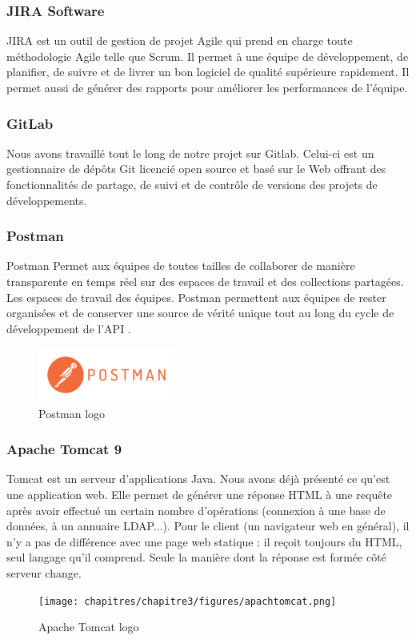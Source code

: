 \subsubsection*{JIRA Software}
JIRA est un outil de gestion de projet Agile qui prend en charge toute m\'ethodologie Agile telle que Scrum. Il permet \`a une \'equipe de d\'eveloppement, de planifier, de suivre et de livrer un bon logiciel de qualit\'e sup\'erieure rapidement. Il permet aussi de g\'en\'erer des rapports pour am\'eliorer les performances de l'\'equipe.
\subsubsection*{GitLab}
Nous avons travaill\'e tout le long de notre projet sur Gitlab. Celui-ci est un gestionnaire de d\'ep\^ots Git licenci\'e open source et bas\'e sur le Web offrant des fonctionnalit\'es de partage, de suivi et de contr\^ole de versions des projets de d\'eveloppements.

\subsubsection*{Postman}
Postman Permet aux \'equipes de toutes tailles de collaborer de mani\`ere transparente en temps r\'eel sur des espaces de travail et des collections partag\'ees. Les espaces de travail des \'equipes. Postman permettent aux \'equipes de rester organis\'ees et de conserver une source de v\'erit\'e unique tout au long du cycle de d\'eveloppement de l'API \cite{Postman}.
\begin{figure}[!ht]\centering
\includegraphics[width=0.4\textwidth]{chapitres/chapitrex/figures/postman.png}
\caption{Postman logo}
\label{fig:postman}
\end{figure}
\subsubsection*{Apache Tomcat 9}
Tomcat est un serveur d'applications Java. Nous avons déjà présenté ce qu'est une application web. Elle permet de générer une réponse HTML à une requête après avoir effectué un certain nombre d'opérations (connexion à une base de données, à un annuaire LDAP...). Pour le client (un navigateur web en général), il n'y a pas de différence avec une page web statique : il reçoit toujours du HTML, seul langage qu'il comprend. Seule la manière dont la réponse est formée côté serveur change.
\begin{figure}[!ht]\centering
\texttt{[image: chapitres/chapitre3/figures/apachtomcat.png]}
\caption{Apache Tomcat logo}
\label{fig:apachtomcat}
\end{figure}

